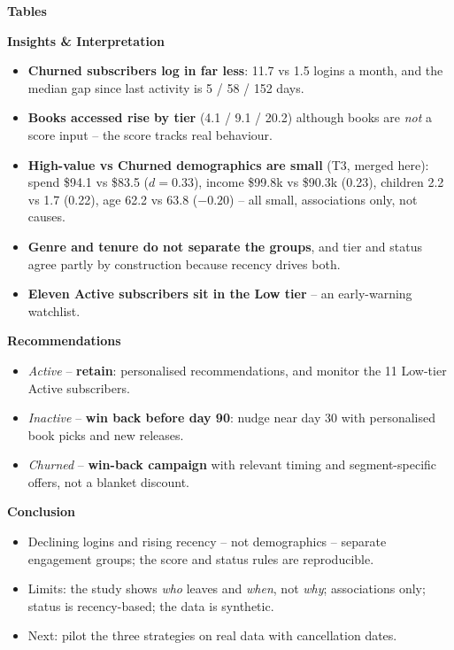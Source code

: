 \documentclass[final]{beamer}
\newlength{\colwidth}
\begin{document}
\begin{frame}[t]
\begin{columns}[t]
\begin{column}{\colwidth}
\begin{block}{\textbf{Tables}}
\end{block}

\begin{block}{\textbf{Insights \& Interpretation}}
\begin{itemize}
\justifying
    \item \textbf{Churned subscribers log in far less}: 11.7 vs 1.5 logins a month, and the median gap since last activity is 5 / 58 / 152 days.
    \item \textbf{Books accessed rise by tier} (4.1 / 9.1 / 20.2) although books are \emph{not} a score input -- the score tracks real behaviour.
    \item \textbf{High-value vs Churned demographics are small} (T3, merged here): spend \$94.1 vs \$83.5 ($d = 0.33$), income \$99.8k vs \$90.3k (0.23), children 2.2 vs 1.7 (0.22), age 62.2 vs 63.8 ($-0.20$) -- all small, associations only, not causes.
    \item \textbf{Genre and tenure do not separate the groups}, and tier and status agree partly by construction because recency drives both.
    \item \textbf{Eleven Active subscribers sit in the Low tier} -- an early-warning watchlist.
\end{itemize}
\end{block}

\begin{alertblock}{\textbf{Recommendations}}
\begin{itemize}
\justifying
    \item \emph{Active} -- \textbf{retain}: personalised recommendations, and monitor the 11 Low-tier Active subscribers.
    \item \emph{Inactive} -- \textbf{win back before day 90}: nudge near day 30 with personalised book picks and new releases.
    \item \emph{Churned} -- \textbf{win-back campaign} with relevant timing and segment-specific offers, not a blanket discount.
\end{itemize}
\end{alertblock}

\begin{alertblock}{\textbf{Conclusion}}
\begin{itemize}
\justifying
    \item Declining logins and rising recency -- not demographics -- separate engagement groups; the score and status rules are reproducible.
    \item Limits: the study shows \emph{who} leaves and \emph{when}, not \emph{why}; associations only; status is recency-based; the data is synthetic.
    \item Next: pilot the three strategies on real data with cancellation dates.
\end{itemize}
\end{alertblock}


\end{column}
\end{columns}
\end{frame}
\end{document}
